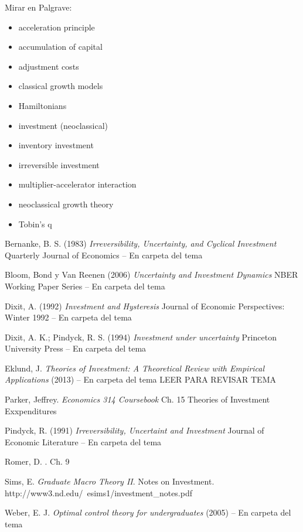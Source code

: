 \documentclass{nuevotema}
\begin{document}
\bibliografia
Mirar en Palgrave:
\begin{itemize}
    \item acceleration principle
    \item accumulation of capital
    \item adjustment costs
    \item classical growth models
    \item Hamiltonians
    \item investment (neoclassical)
    \item inventory investment
    \item irreversible investment
    \item multiplier-accelerator interaction
    \item neoclassical growth theory
    \item Tobin's q
\end{itemize}

Bernanke, B. S. (1983) \textit{Irreversibility, Uncertainty, and Cyclical Investment} Quarterly Journal of Economics -- En carpeta del tema

Bloom, Bond y Van Reenen (2006) \textit{Uncertainty and Investment Dynamics} NBER Working Paper Series -- En carpeta del tema

Dixit, A. (1992) \textit{Investment and Hysteresis} Journal of Economic Perspectives: Winter 1992 -- En carpeta del tema

Dixit, A. K.; Pindyck, R. S. (1994) \textit{Investment under uncertainty} Princeton University Press -- En carpeta del tema

Eklund, J. \textit{Theories of Investment: A Theoretical Review with Empirical Applications} (2013) -- En carpeta del tema LEER PARA REVISAR TEMA

Parker, Jeffrey. \textit{Economics 314 Coursebook} Ch. 15 Theories of Investment Exxpenditures

Pindyck, R. (1991) \textit{Irreversibility, Uncertaint and Investment} Journal of Economic Literature -- En carpeta del tema

Romer, D. . Ch. 9

Sims, E. \textit{Graduate Macro Theory II}. Notes on Investment. http://www3.nd.edu/~esims1/investment\_notes.pdf

Weber, E. J. \textit{Optimal control theory for undergraduates} (2005) -- En carpeta del tema
\end{document}
